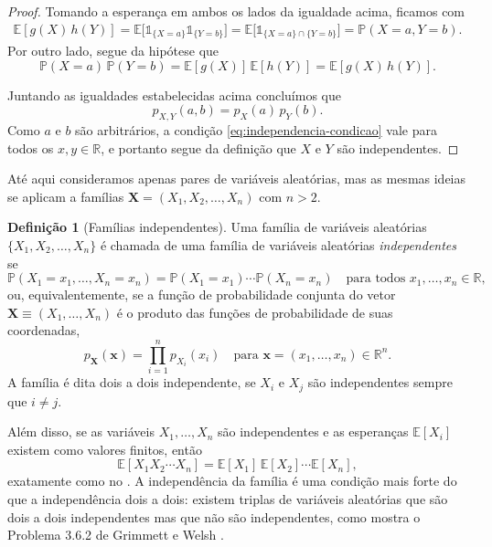 \documentclass[12pt,portuguese]{article}
\theoremstyle{definition}
\newtheorem{definition}[definition]{Definição}
\begin{document}
\begin{proof}
Tomando a esperança em ambos os lados da igualdade acima, ficamos com
\begin{align*}
\mathbb{E}[g(X)\,h(Y)] 
= 
\mathbb{E}\bigl[ \mathds{1}_{\{X=a\}}\mathds{1}_{\{Y=b\}} \bigr]
=
\mathbb{E}\bigl[ \mathds{1}_{\{X=a\}\cap \{Y=b\}}\bigr]
=
\mathbb{P}(X = a, Y = b).
\end{align*}
Por outro lado, segue da hipótese que 
\[
\mathbb{P}(X = a)\,\mathbb{P}(Y = b)
=
\mathbb{E}[g(X)]\,\mathbb{E}[h(Y)] 
=
\mathbb{E}[g(X)\, h(Y)].
\]

Juntando as igualdades estabelecidas acima concluímos que
$$p_{X,Y}(a,b) = p_X(a)\,p_Y(b).$$ 
Como $a$ e $b$ são arbitrários, a condição
\eqref{eq:independencia-condicao} vale para todos os $x, y \in \mathbb{R}$, e
portanto segue da definição que 
$X$ e $Y$ são independentes.
\end{proof}


Até aqui consideramos apenas pares de variáveis aleatórias, mas as mesmas ideias
se aplicam a famílias $\mathbf{X} = (X_1, X_2, \ldots, X_n)$ com $n > 2$.

\begin{definition}[Famílias independentes]\label{def:independencia-familias}
Uma família de variáveis aleatórias 
$\{ X_1, X_2, \ldots, X_n\}$ é chamada de uma família de variáveis aleatórias
\emph{independentes} se
\[
\mathbb{P}(X_1 = x_1, \ldots, X_n = x_n)
= \mathbb{P}(X_1 = x_1)\cdots\mathbb{P}(X_n = x_n)
\quad \text{para todos } x_1, \ldots, x_n \in \mathbb{R},
\]
ou, equivalentemente, se a função de probabilidade conjunta do 
vetor $\mathbf{X}\equiv (X_1, \ldots, X_n)$ é o
produto das funções de probabilidade de suas coordenadas,
\[
p_{\mathbf{X}}(\mathbf{x}) = \prod_{i=1}^{n} p_{X_i}(x_i)
\quad \text{para } \mathbf{x} = (x_1, \ldots, x_n) \in \mathbb{R}^n.
\]
A família é dita dois a dois independente, se $X_i$ e $X_j$ são
independentes sempre que $i \neq j$.
\end{definition}

Além disso, se as variáveis $X_1, \ldots, X_n$ são independentes e as esperanças
$\mathbb{E}[X_i]$ existem como valores finitos, então
\[
\mathbb{E}[X_1 X_2 \cdots X_n]
= \mathbb{E}[X_1]\,\mathbb{E}[X_2]\cdots\mathbb{E}[X_n],
\]
exatamente como no . A independência da família é
uma condição mais forte do que a independência dois a dois: existem triplas de
variáveis aleatórias que são dois a dois independentes mas que não são independentes, 
como mostra o Problema 3.6.2 de Grimmett e Welsh \cite[p.~48]{GrimmettWelsh2014}.
\end{document}
